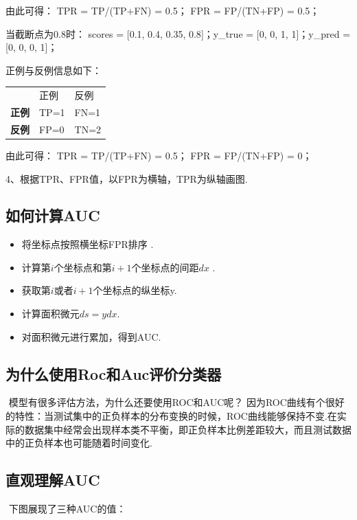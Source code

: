 由此可得： TPR = TP/(TP+FN) = 0.5； FPR = FP/(TN+FP) = 0.5；

当截断点为0.8时： scores = {[}0.1, 0.4, 0.35, 0.8{]}；y\_true = {[}0, 0,
1, 1{]}；y\_pred = {[}0, 0, 0, 1{]}；

正例与反例信息如下：

\begin{longtable}[]{ lll }
& 正例 & 反例\tabularnewline
\textbf{正例} & TP=1 & FN=1\tabularnewline
\textbf{反例} & FP=0 & TN=2\tabularnewline
\end{longtable}

由此可得： TPR = TP/(TP+FN) = 0.5； FPR = FP/(TN+FP) = 0；

4、根据TPR、FPR值，以FPR为横轴，TPR为纵轴画图.

\subsection{如何计算AUC}\label{ux5982ux4f55ux8ba1ux7b97auc}

\begin{itemize}
\item
  将坐标点按照横坐标FPR排序 .
\item
  计算第$i$个坐标点和第$i+1$个坐标点的间距$dx$ .
\item
  获取第$i$或者$i+1$个坐标点的纵坐标y.
\item
  计算面积微元$ds=ydx$.
\item
  对面积微元进行累加，得到AUC.
\end{itemize}

\subsection{为什么使用Roc和Auc评价分类器}\label{ux4e3aux4ec0ux4e48ux4f7fux7528rocux548caucux8bc4ux4ef7ux5206ux7c7bux5668}

​ 模型有很多评估方法，为什么还要使用ROC和AUC呢？ ​
因为ROC曲线有个很好的特性：当测试集中的正负样本的分布变换的时候，ROC曲线能够保持不变.在实际的数据集中经常会出现样本类不平衡，即正负样本比例差距较大，而且测试数据中的正负样本也可能随着时间变化.

\subsection{直观理解AUC}\label{ux76f4ux89c2ux7406ux89e3auc}

​ 下图展现了三种AUC的值：


